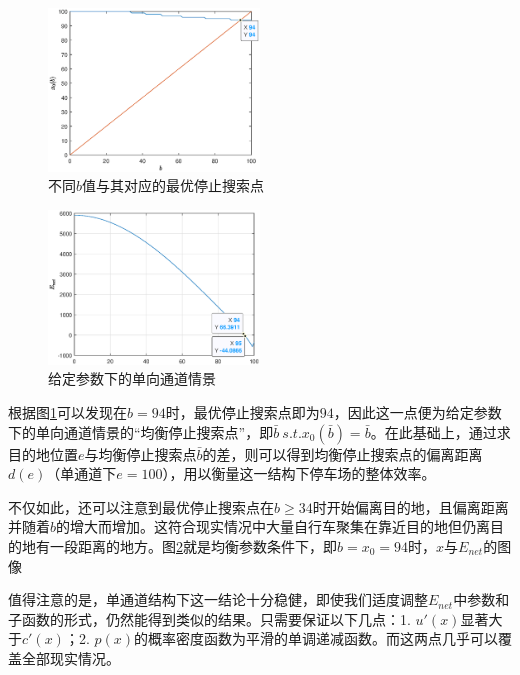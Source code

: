 \documentclass{thuemp}
\begin{document}
\begin{figure}[H]
    \centering
    \includegraphics[width=0.5\textwidth]{single_entrance_b_x.eps}
    \caption{不同$b$值与其对应的最优停止搜索点}
    \label{fig:2}
\end{figure}

\begin{figure}[H]
    \centering
    \includegraphics[width=0.5\textwidth]{single_entrance.eps}
    \caption{给定参数下的单向通道情景}
    \label{fig:3}
\end{figure}

\par 根据图\ref{fig:2}可以发现在$b=94$时，最优停止搜索点即为$94$，因此这一点便为给定参数下的单向通道情景的“均衡停止搜索点”，即$\bar{b}~s.t.x_0(\bar{b})=\bar{b}$。在此基础上，通过求目的地位置$e$与均衡停止搜索点$\bar{b}$的差，则可以得到均衡停止搜索点的偏离距离$d(e)$（单通道下$e=100$），用以衡量这一结构下停车场的整体效率。
\par 不仅如此，还可以注意到最优停止搜索点在$b\geq 34$时开始偏离目的地，且偏离距离并随着$b$的增大而增加。这符合现实情况中大量自行车聚集在靠近目的地但仍离目的地有一段距离的地方。图\ref{fig:3}就是均衡参数条件下，即$b=x_0=94$时，$x$与$E_{net}$的图像

\par 值得注意的是，单通道结构下这一结论十分稳健，即使我们适度调整$E_{net}$中参数和子函数的形式，仍然能得到类似的结果。只需要保证以下几点：1. $u'(x)$显著大于$c'(x)$；2. $p(x)$的概率密度函数为平滑的单调递减函数。而这两点几乎可以覆盖全部现实情况。
\end{document}
